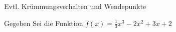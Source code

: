 \documentclass[
    ngerman,
    color=1b,
    load_common,
    leqno,
    boxarc,
    solution=true,
]{rubos-tuda-template}
\begin{document}
\begin{task}[points=1]{Evtl. Krümmungsverhalten und Wendepunkte}
    \begin{grayInfoBox}
        Gegeben Sei die Funktion $f(x)=\frac{1}{3}x^3-2x^2+3x+2$
    \end{grayInfoBox}
\end{task}








\end{document}
